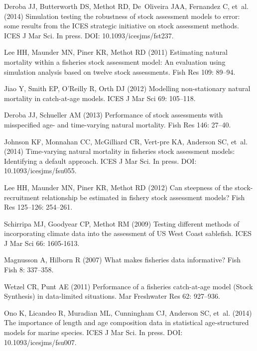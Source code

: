 \documentclass[10pt]{article}
\begin{document}
\begin{thebibliography}{10}
Deroba JJ, Butterworth DS, Methot RD, De~Oliveira JAA, Fernandez C, et~al. (2014)
  Simulation testing the robustness of stock assessment models to error: some
  results from the {ICES} strategic initiative on stock assessment methods.
\newblock ICES J Mar Sci. In press. DOI: 10.1093/icesjms/fst237.

Lee HH, Maunder MN, Piner KR, Methot RD (2011) Estimating natural mortality
  within a fisheries stock assessment model: An evaluation using simulation
  analysis based on twelve stock assessments.
\newblock Fish Res 109: 89--94.

Jiao Y, Smith EP, O'Reilly R, Orth DJ (2012) Modelling non-stationary natural
  mortality in catch-at-age models.
\newblock ICES J Mar Sci 69: 105--118.

Deroba JJ, Schueller AM (2013) Performance of stock assessments with
  misspecified age- and time-varying natural mortality.
\newblock Fish Res 146: 27--40.

Johnson KF, Monnahan CC, McGilliard CR, Vert-pre KA, Anderson SC, et~al. (2014)
  Time-varying natural mortality in fisheries stock assessment models:
  Identifying a default approach.
\newblock ICES J Mar Sci. In press. DOI: 10.1093/icesjms/fsu055.

Lee HH, Maunder MN, Piner KR, Methot RD (2012) Can steepness of the
  stock-recruitment relationship be estimated in fishery stock assessment
  models?
\newblock Fish Res 125--126: 254--261.

Schirripa MJ, Goodyear CP, Methot RM (2009) Testing different methods of
  incorporating climate data into the assessment of {US West Coast} sablefish.
\newblock ICES J Mar Sci 66: 1605-1613.

Magnusson A, Hilborn R (2007) What makes fisheries data informative?
\newblock Fish Fish 8: 337--358.

Wetzel CR, Punt AE (2011) Performance of a fisheries catch-at-age model ({Stock
  Synthesis}) in data-limited situations.
\newblock Mar Freshwater Res 62: 927--936.

Ono K, Licandeo R, Muradian ML, Cunningham CJ, Anderson SC, et~al. (2014) The
  importance of length and age composition data in statistical age-structured
  models for marine species.
\newblock ICES J Mar Sci. In press. DOI: 10.1093/icesjms/fsu007.


\end{thebibliography}
\end{document}
